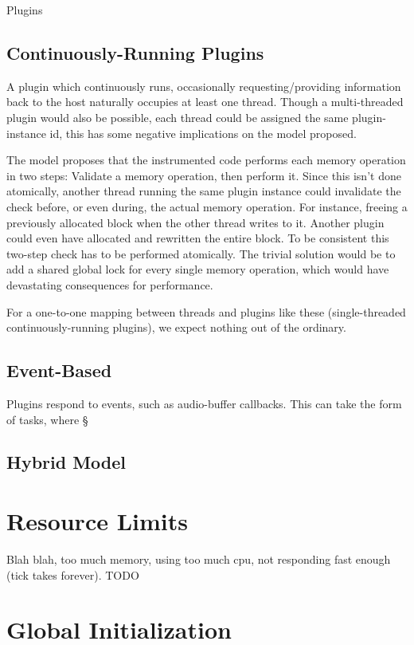 Plugins 

\subsection {Continuously-Running Plugins}

A plugin which continuously runs, occasionally requesting/providing information
back to the host naturally occupies at least one thread. Though a multi-threaded
plugin would also be possible, each thread could be assigned the same
plugin-instance id, this has some negative implications on the model proposed.

The model proposes that the instrumented code performs each memory operation in
two steps: Validate a memory operation, then perform it. Since this isn't done
atomically, another thread running the same plugin instance could invalidate the
check before, or even during, the actual memory operation. For instance, freeing
a previously allocated block when the other thread writes to it. Another plugin
could even have allocated and rewritten the entire block. To be consistent this
two-step check has to be performed atomically. The trivial solution would be to
add a shared global lock for every single memory operation, which would have
devastating consequences for performance.

For a one-to-one mapping between threads and plugins like these (single-threaded
continuously-running plugins), we expect nothing out of the ordinary.

\subsection {Event-Based}

Plugins respond to events, such as audio-buffer callbacks. This can take the
form of tasks, where §

\subsection {Hybrid Model}


\section {Resource Limits}

Blah blah, too much memory, using too much cpu, not responding fast enough (tick
takes forever). TODO


\section {Global Initialization}

